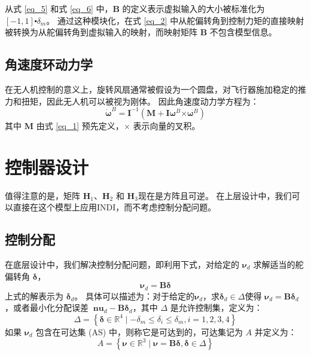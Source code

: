 \begin{ubox}
从式 \eqref{eq_5} 和式 \eqref{eq_6} 中，$\bm{B}$ 的定义表示虚拟输入的大小被标准化为 $[-1,1] \centerdot {{\delta }_{m }}$。 通过这种模块化，在式 \eqref{eq_2} 中从舵偏转角到控制力矩的直接映射被转换为从舵偏转角到虚拟输入的映射，而映射矩阵 $\bm{B}$ 不包含模型信息。


\subsection{角速度环动力学}
在无人机控制的意义上，旋转风扇通常被假设为一个圆盘，对飞行器施加稳定的推力和扭矩，因此无人机可以被视为刚体。 因此角速度动力学方程为：
\begin{equation}
	{{\bm{\dot \omega }}^B} = {{\bm{I}}^{ - 1}}\left( {{\bm{M + I}}{{\bm{\omega }}^B}{\bm{ \times }}{{\bm{\omega }}^B}} \right)
	\label{eq_16}
\end{equation}
其中 $\bm M$ 由式 \eqref{eq_1} 预先定义，$\times$ 表示向量的叉积。

\section{控制器设计}
值得注意的是，矩阵 ${{\bm{H}}_{1}}$、${{\bm{H}}_{2}}$ 和 ${{\bm{H}}_{3}}$现在是方阵且可逆。 在上层设计中，我们可以直接在这个模型上应用INDI，而不考虑控制分配问题。


\subsection{控制分配}
在底层设计中，我们解决控制分配问题，即利用下式，对给定的 ${{\bm{\nu }}_{d}}$ 求解适当的舵偏转角 $\bm{\delta }$，
\begin{equation}
	{\bm {\nu}_d}={\bm{B\delta}}
	\label{eq_29.5}
\end{equation}
上式的解表示为 $\bm{\delta }_d$。 具体可以描述为：对于给定的${{\bm{\nu }}_{d}}$，求${{\bm{\delta }}_{d}}\in \Delta $使得 ${{\bm{\nu }}_{d}}=\bm{B}{{\bm{\delta }}_{d}}$，或者最小化分配误差 ${{\bm{\ nu }}_{d}}-\bm{B}{{\bm{\delta }}_{d}}$，其中 $\Delta $ 是允许控制集，定义为：
\begin{equation}
	\Delta=\left\{\bm{\delta} \in \mathbb{R}^{4} \mid-\delta_{m} \leq \delta_{i} \leq \delta_{m}, i=1,2,3,4\right\}
	\label{eq_30}
\end{equation}
如果 ${{\bm{\nu }}_{d}}$ 包含在可达集 (AS) 中，则称它是可达到的，可达集记为 $A$ 并定义为：
\begin{equation}
	A=\left\{\bm{\nu} \in \mathbb{R}^{3} \mid \bm{\nu}=\bm{B} \bm{\delta}, \bm{\delta} \in \Delta\right\}
	\label{eq_31}
\end{equation}




\end{ubox}
